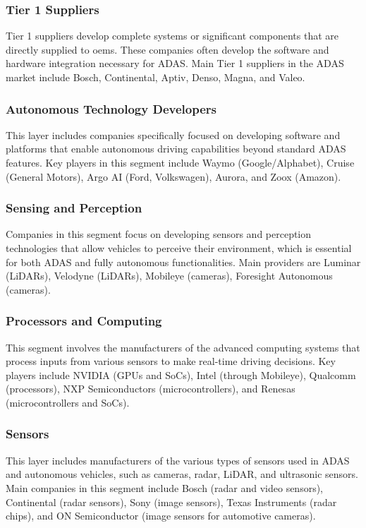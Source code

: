 \subsubsection{Tier 1 Suppliers}
Tier 1 suppliers develop complete systems or significant components that are 
directly supplied to \ac{oems}. These companies often develop the software and 
hardware integration necessary for ADAS.
Main Tier 1 suppliers in the ADAS market include Bosch, Continental, Aptiv, 
Denso, Magna, and Valeo.

\subsubsection{Autonomous Technology Developers}
This layer includes companies specifically focused on developing software and 
platforms that enable autonomous driving capabilities beyond standard ADAS features.
Key players in this segment include Waymo (Google/Alphabet), Cruise (General Motors),
Argo AI (Ford, Volkswagen), Aurora, and Zoox (Amazon).

\subsubsection{Sensing and Perception}
Companies in this segment focus on developing sensors and perception technologies 
that allow vehicles to perceive their environment, which is essential for both 
ADAS and fully autonomous functionalities.
Main providers are Luminar (LiDARs), Velodyne (LiDARs), Mobileye (cameras), 
Foresight Autonomous (cameras).

\subsubsection{Processors and Computing}
This segment involves the manufacturers of the advanced computing systems that 
process inputs from various sensors to make real-time driving decisions.
Key players include NVIDIA (GPUs and SoCs), Intel (through Mobileye), 
Qualcomm (processors), NXP Semiconductors (microcontrollers), and 
Renesas (microcontrollers and SoCs).

\subsubsection{Sensors}
This layer includes manufacturers of the various types of sensors used in ADAS 
and autonomous vehicles, such as cameras, radar, LiDAR, and ultrasonic sensors.
Main companies in this segment include Bosch (radar and video sensors),
Continental (radar sensors), Sony (image sensors), Texas Instruments (radar chips),
and ON Semiconductor (image sensors for automotive cameras).


